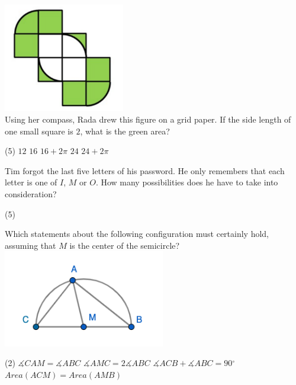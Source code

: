 \documentclass{article}
\newcommand{\degree}{\ensuremath{^{\circ}}}
\renewcommand{\angle}{\measuredangle}
\begin{document}
\newpage

\begin{problem}
\includegraphics[width=150pt]{img5} \\
Using her compass, Rada drew this figure on a grid paper. If the side length of one small square is $2$, what is the green area?
\end{problem}
\begin{tasks}(5)
\task $12$
\task $16$
\task $16 + 2\pi$
\task $24$
\task $24 + 2\pi$
\end{tasks}

\begin{problem}
Tim forgot the last five letters of his password. He only remembers that each letter is one of $I$, $M$ or $O$. How many possibilities does he have to take into consideration? \\
\end{problem}
\begin{tasks}(5)
\end{tasks}

\begin{problem}
Which statements about the following configuration must certainly hold, assuming that $M$ is the center of the semicircle?\\
\includegraphics[width=200pt]{img1}
\begin{tasks2}(2)
\task $\angle CAM = \angle ABC$
\task $\angle AMC = 2\angle ABC$
\task $\angle ACB + \angle ABC = 90\degree$
\task $Area(ACM) = Area(AMB)$
\end{tasks2}
\end{problem}
\end{document}
